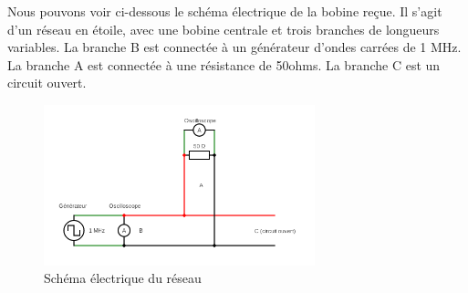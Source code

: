 Nous pouvons voir ci-dessous le schéma électrique de la bobine reçue. Il s'agit d'un réseau en étoile, avec une bobine centrale et trois branches de longueurs variables. La branche B est connectée à un générateur d'ondes carrées de 1 MHz. La branche A est connectée à une résistance de 50ohms. La branche C est un circuit ouvert.

\begin{figure}[H]
    \centering
    \includegraphics[width=0.7\textwidth]{images/circuit-diagram.png}
    \caption{Schéma électrique du réseau}
    \label{fig:Schema electrique}
\end{figure}

